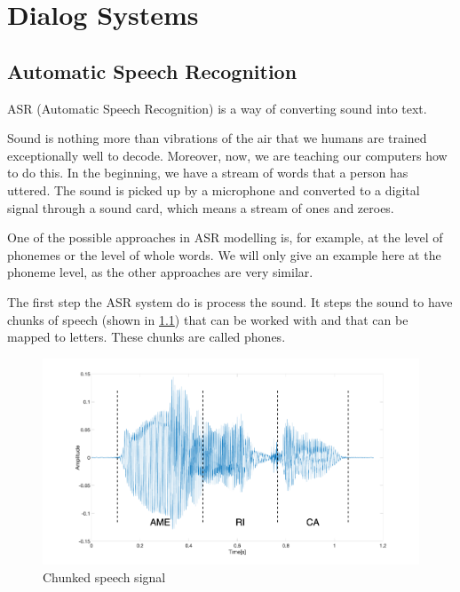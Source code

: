 \chapter{Dialog Systems} \label{chap:dialog_systems}



\section{Automatic Speech Recognition}

ASR (Automatic Speech Recognition) is a way of converting sound into text. 

Sound is nothing more than vibrations of the air that we humans are trained exceptionally well to decode. Moreover, now, we are teaching our computers how to do this. In the beginning, we have a stream of words that a person has uttered. The sound is picked up by a microphone and converted to a digital signal through a sound card, which means a stream of ones and zeroes.

One of the possible approaches in ASR modelling is, for example, at the level of phonemes or the level of whole words. We will only give an example here at the phoneme level, as the other approaches are very similar.

The first step the ASR system do is process the sound. It steps the sound to have chunks of speech (shown in \cref{fig:chunked_voice}) that can be worked with and that can be mapped to letters. These chunks are called phones. 

\begin{figure}[H]
    \centering
    \includegraphics[width=\textwidth]{img/voice_edit.png}
    \caption{Chunked speech signal}
    \label{fig:chunked_voice}
\end{figure}

